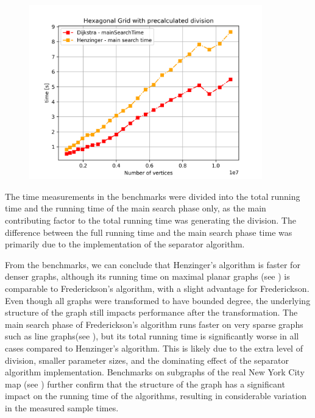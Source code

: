 \begin{figure}[H]
    \centering
    \includegraphics[width=0.9\textwidth]{charts/PrecalculatedHenzinger.png}
    \caption{}
    \label{fig:PrecalculatedHenzinger}
\end{figure}

The time measurements in the benchmarks were divided into the total running time and the running time of the main search phase only, as the main contributing factor to the total running time was generating the division. The difference between the full running time and the main search phase time was primarily due to the implementation of the separator algorithm.

From the benchmarks, we can conclude that Henzinger's algorithm is faster for denser graphs, although its running time on maximal planar graphs (see ) is comparable to Frederickson's algorithm, with a slight advantage for Frederickson. Even though all graphs were transformed to have bounded degree, the underlying structure of the graph still impacts performance after the transformation. The main search phase of Frederickson's algorithm runs faster on very sparse graphs such as line graphs(see ), but its total running time is significantly worse in all cases compared to Henzinger's algorithm. This is likely due to the extra level of division, smaller parameter sizes, and the dominating effect of the separator algorithm implementation. Benchmarks on subgraphs of the real New York City map (see ) further confirm that the structure of the graph has a significant impact on the running time of the algorithms, resulting in considerable variation in the measured sample times.